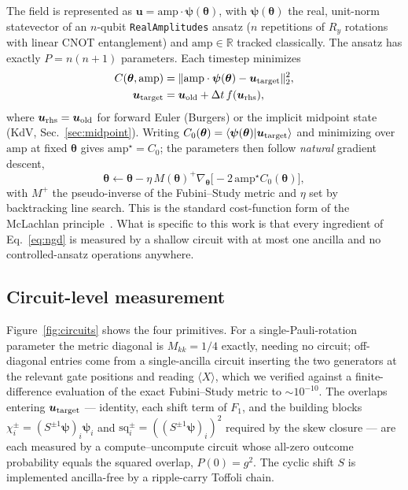 \documentclass[aps,prx,twocolumn,notitlepage,superscriptaddress,floatfix,10pt]{revtex4-2}
\renewcommand{\braket}[2]{\langle #1 \vert #2 \rangle}
\newcommand{\norm}[1]{\lVert #1 \rVert}
\newcommand{\R}{\mathbb{R}}
\begin{document}
The field is represented as $\bm u=\mathrm{amp}\cdot\bm\psi(\bm\theta)$, with $\bm\psi(\bm\theta)$
the real, unit-norm statevector of an $n$-qubit \texttt{RealAmplitudes} ansatz ($n$ repetitions of
$R_y$ rotations with linear CNOT entanglement) and $\mathrm{amp}\in\R$ tracked classically. The ansatz
has exactly $P=n(n+1)$ parameters. Each timestep minimizes
\begin{align}
C(\bm\theta,\mathrm{amp}) &= \norm{\mathrm{amp}\cdot\bm\psi(\bm\theta)-\bm u_{\rm target}}_2^2,\\
\bm u_{\rm target}&=\bm u_{\rm old}+\Delta t\,f(\bm u_{\rm rhs}),
\label{eq:cost}
\end{align}
where $\bm u_{\rm rhs}=\bm u_{\rm old}$ for forward Euler (Burgers) or the implicit midpoint state
(KdV, Sec.~\ref{sec:midpoint}). Writing $C_0(\bm\theta)=\braket{\bm\psi(\bm\theta)}{\bm u_{\rm
target}}$ and minimizing over $\mathrm{amp}$ at fixed $\bm\theta$ gives $\mathrm{amp}^\star=C_0$; the
parameters then follow \emph{natural} gradient descent,
\begin{equation}
\bm\theta\leftarrow\bm\theta-\eta\,M(\bm\theta)^{+}\nabla_{\bm\theta}\big[-2\,\mathrm{amp}^\star C_0(\bm\theta)\big],
\label{eq:ngd}
\end{equation}
with $M^+$ the pseudo-inverse of the Fubini--Study metric and $\eta$ set by backtracking line search.
This is the standard cost-function form of the McLachlan principle~\cite{McLachlan1964,Yuan2019}.
What is specific to this work is that every ingredient of Eq.~\eqref{eq:ngd} is measured by a shallow
circuit with at most one ancilla and no controlled-ansatz operations anywhere.

\subsection{Circuit-level measurement}

Figure~\ref{fig:circuits} shows the four primitives. For a single-Pauli-rotation parameter the metric
diagonal is $M_{kk}=1/4$ exactly, needing no circuit; off-diagonal entries come from a single-ancilla
circuit inserting the two generators at the relevant gate positions and reading $\langle X\rangle$,
which we verified against a finite-difference evaluation of the exact Fubini--Study metric to
$\sim10^{-10}$. The overlaps entering $\bm u_{\rm target}$ --- identity, each shift term of $F_1$, and
the building blocks $\chi^\pm_i=(S^{\pm1}\bm\psi)_i\bm\psi_i$ and
$\mathrm{sq}^\pm_i=((S^{\pm1}\bm\psi)_i)^2$ required by the skew closure --- are each measured by a
compute--uncompute circuit whose all-zero outcome probability equals the squared overlap,
$P(0)=g^2$. The cyclic shift $S$ is implemented ancilla-free by a ripple-carry Toffoli chain.
\end{document}
